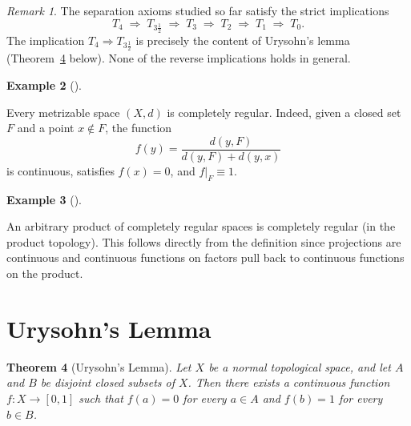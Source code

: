 \documentclass[11pt,a4paper,twoside]{book}
\newtheorem{theorem}{Theorem}[section]
\theoremstyle{remark}
\newtheorem{remark}[theorem]{Remark}
\theoremstyle{definition}
\newtheorem{exampleplain}[theorem]{Example}
\theoremstyle{definition}
\newenvironment{example}[1][]{%
  \begin{exampleplain}[#1]\itshape
}{%
  \end{exampleplain}
}
\begin{document}
\begin{remark}
\label{rem:separation-hierarchy-review}
The separation axioms studied so far satisfy the strict implications
\[
  T_4 \;\Longrightarrow\; T_{3\tfrac{1}{2}}
  \;\Longrightarrow\; T_3 \;\Longrightarrow\; T_2
  \;\Longrightarrow\; T_1 \;\Longrightarrow\; T_0.
\]
The implication $T_4\Rightarrow T_{3\frac{1}{2}}$ is precisely the
content of Urysohn's lemma (Theorem~\ref{thm:urysohn-lemma} below).
None of the reverse implications holds in general.
\end{remark}

\begin{example}
\label{ex:metric-completely-regular}
Every metrizable space $(X,d)$ is completely regular.  Indeed, given a
closed set $F$ and a point $x\notin F$, the function
\[
  f(y) = \frac{d(y,F)}{d(y,F)+d(y,x)}
\]
is continuous, satisfies $f(x)=0$, and $f|_F\equiv 1$.
\end{example}

\begin{example}
\label{ex:product-completely-regular}
An arbitrary product of completely regular spaces is completely regular
(in the product topology).  This follows directly from the definition
since projections are continuous and continuous functions on factors
pull back to continuous functions on the product.
\end{example}

\section{Urysohn's Lemma}
\label{sec:urysohn-lemma}

\begin{theorem}[Urysohn's Lemma]
\label{thm:urysohn-lemma}
Let $X$ be a normal topological space, and let $A$
and $B$ be disjoint closed subsets of $X$.  Then there exists a
continuous function $f\colon X\to[0,1]$ such that $f(a)=0$ for every
$a\in A$ and $f(b)=1$ for every $b\in B$.
\end{theorem}
\end{document}
